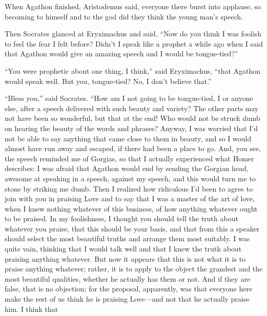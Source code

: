 When Agathon finished, Aristodemus said, everyone there burst into
applause, so becoming to himself and to the god did they think the young
man’s speech.

Then Socrates glanced at Eryximachus and said, “Now do you think I was
foolish to feel the fear I felt before? Didn’t I speak like a prophet a
while ago when I said that Agathon would give an amazing speech and I
would be tongue-tied?”

“You were prophetic about one thing, I think,” said Eryximachus, “that
Agathon would speak well. But you, tongue-tied? No, I don’t believe
that.” 

“Bless you,” said Socrates. “How am I not going to be tongue-tied, I or
anyone else, after a speech delivered with such beauty and variety? The
other parts may not have been so wonderful, but that at the end! Who
would not be struck dumb on hearing the beauty of the words and phrases?
Anyway, I was worried that I’d not be able to say anything that came
close to them in beauty, and so I would almost have run away and
escaped,  if there had been a place to go. And, you see, the
speech reminded me of Gorgias, so that I actually experienced what Homer
describes: I was afraid that Agathon would end by sending the Gorgian
head,
awesome at
speaking in a speech, against my speech, and this would turn me to stone
by striking me dumb. Then I realized how ridiculous I’d been to agree to
join  with you in praising Love and to say that I was a master of
the art of love, when I knew nothing whatever of this business, of how
anything whatever ought to be praised. In my foolishness, I thought you
should tell the truth about whatever you praise, that this should be
your basis, and that from this a speaker should select the most
beautiful truths and arrange them most suitably. I was quite vain,
thinking that I would talk well and that I knew the truth about praising
anything whatever. But now it appears that this is not what it is to
praise anything whatever; rather, it is to apply  to the object
the grandest and the most beautiful qualities, whether he actually has
them or not. And if they are false, that is no objection; for the
proposal, apparently, was that everyone here make the rest of us think
he is praising Love---and not that he actually praise him. I think that
